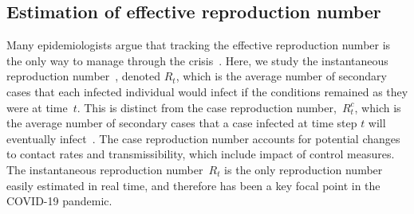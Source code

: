 \documentclass[11pt]{amsart}
\numberwithin{equation}{section}
\theoremstyle{plain}
\begin{document}
 \subsection{Estimation of effective reproduction number}
 \label{section:r0-estimation}
 Many epidemiologists argue that tracking the effective reproduction number is the only way to manage through the crisis~\citep{Gabriel2020}.
Here, we study the instantaneous reproduction number~\citep{Cori20113,Fraser2007}, denoted $R_t$, which is the average number of secondary cases that each infected individual would infect if the conditions remained as they were at time~$t$.  This is distinct from the case reproduction number,~$R_t^c$, which is the average number of secondary cases that a case infected at time step $t$ will eventually infect~\citep{Wallinga2004}. The case reproduction number accounts for potential changes to contact rates and transmissibility, which include impact of control measures.  The instantaneous reproduction number~$R_t$ is the only reproduction number easily estimated in real time, and therefore has been a key focal point in the COVID-19 pandemic.

\end{document}
